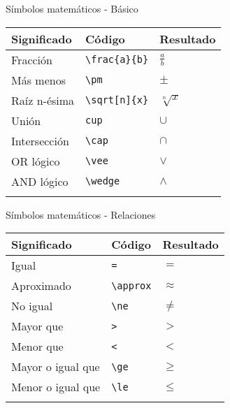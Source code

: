 \documentclass[
  ignorenonframetext,
]{beamer}
\begin{document}
\begin{frame}[fragile]{Símbolos matemáticos - Básico}
\protect\hypertarget{suxedmbolos-matemuxe1ticos---buxe1sico-1}{}
\begin{longtable}[]{@{}lll@{}}
\toprule\noalign{}
Significado & Código & Resultado \\
\midrule\noalign{}
\endhead
Fracción & \texttt{\textbackslash{}frac\{a\}\{b\}} & \(\frac{a}{b}\) \\
Más menos & \texttt{\textbackslash{}pm} & \(\pm\) \\
Raíz n-ésima & \texttt{\textbackslash{}sqrt{[}n{]}\{x\}} &
\(\sqrt[n]{x}\) \\
Unión & \texttt{cup} & \(\cup\) \\
Intersección & \texttt{\textbackslash{}cap} & \(\cap\) \\
OR lógico & \texttt{\textbackslash{}vee} & \(\vee\) \\
AND lógico & \texttt{\textbackslash{}wedge} & \(\wedge\) \\
\bottomrule\noalign{}
\end{longtable}
\end{frame}

\begin{frame}[fragile]{Símbolos matemáticos - Relaciones}
\protect\hypertarget{suxedmbolos-matemuxe1ticos---relaciones}{}
\begin{longtable}[]{@{}lll@{}}
\toprule\noalign{}
Significado & Código & Resultado \\
\midrule\noalign{}
\endhead
Igual & \texttt{=} & \(=\) \\
Aproximado & \texttt{\textbackslash{}approx} & \(\approx\) \\
No igual & \texttt{\textbackslash{}ne} & \(\ne\) \\
Mayor que & \texttt{\textgreater{}} & \(>\) \\
Menor que & \texttt{\textless{}} & \(<\) \\
Mayor o igual que & \texttt{\textbackslash{}ge} & \(\ge\) \\
Menor o igual que & \texttt{\textbackslash{}le} & \(\le\) \\
\bottomrule\noalign{}
\end{longtable}
\end{frame}
\end{document}

